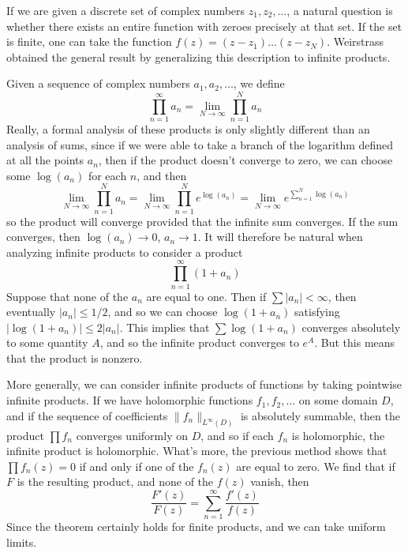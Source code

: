 If we are given a discrete set of complex numbers $z_1, z_2, \dots$, a natural question is whether there exists an entire function with zeroes precisely at that set. If the set is finite, one can take the function $f(z) = (z - z_1) \dots (z - z_N)$. Weirstrass obtained the general result by generalizing this description to infinite products. 

Given a sequence of complex numbers $a_1, a_2, \dots$, we define
%
\[ \prod_{n = 1}^\infty a_n = \lim_{N \to \infty} \prod_{n = 1}^N a_n \]
%
Really, a formal analysis of these products is only slightly different than an analysis of sums, since if we were able to take a branch of the logarithm defined at all the points $a_n$, then if the product doesn't converge to zero, we can choose some $\log(a_n)$ for each $n$, and then
%
\[ \lim_{N \to \infty} \prod_{n = 1}^N a_n = \lim_{N \to \infty} \prod_{n = 1}^N e^{\log(a_n)} = \lim_{N \to \infty} e^{\sum_{n = 1}^N \log(a_n)} \]
%
so the product will converge provided that the infinite sum converges. If the sum converges, then $\log(a_n) \to 0$, $a_n \to 1$. It will therefore be natural when analyzing infinite products to consider a product
%
\[ \prod_{n = 1}^\infty (1 + a_n) \]
%
Suppose that none of the $a_n$ are equal to one. Then if $\sum |a_n| < \infty$, then eventually $|a_n| \leq 1/2$, and so we can choose $\log(1+a_n)$ satisfying $|\log(1 + a_n)| \leq 2|a_n|$. This implies that $\sum \log(1 + a_n)$ converges absolutely to some quantity $A$, and so the infinite product converges to $e^A$. But this means that the product is nonzero.

More generally, we can consider infinite products of functions by taking pointwise infinite products. If we have holomorphic functions $f_1, f_2, \dots$ on some domain $D$, and if the sequence of coefficients $\| f_n \|_{L^\infty(D)}$ is absolutely summable, then the product $\prod f_n$ converges uniformly on $D$, and so if each $f_n$ is holomorphic, the infinite product is holomorphic. What's more, the previous method shows that $\prod f_n(z) = 0$ if and only if one of the $f_n(z)$ are equal to zero. We find that if $F$ is the resulting product, and none of the $f(z)$ vanish, then
%
\[ \frac{F'(z)}{F(z)} = \sum_{n = 1}^\infty \frac{f'(z)}{f(z)} \]
%
Since the theorem certainly holds for finite products, and we can take uniform limits.

